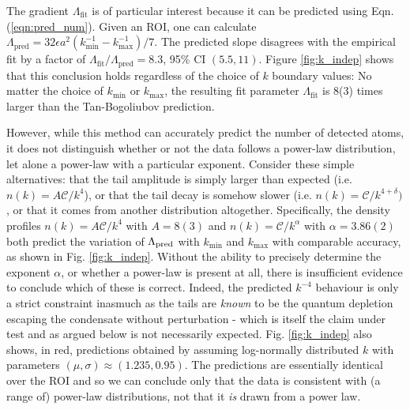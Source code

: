 	The gradient $\Lambda_\textrm{fit}$ is of particular interest because it can be predicted using Eqn. (\ref{eqn:pred_num}).
	Given an ROI, one can calculate $\Lambda_\textrm{pred} = 32\epsilon a^2(k_{\textrm{min}}^{-1}-k_{\textrm{max}}^{-1})/7$.
	The predicted slope disagrees with the empirical fit by a factor of $\Lambda_\textrm{fit}/\Lambda_\textrm{pred}= 8.3$, 95\% CI $(5.5,11)$.
	Figure \ref{fig:k_indep} shows that this conclusion holds regardless of the choice of $k$ boundary values: No matter the choice of $k_\textrm{min}$ or $k_\textrm{max}$, the resulting fit parameter $\Lambda_\textrm{fit}$ is 8(3) times larger than the Tan-Bogoliubov prediction. 

	However, while this method can accurately predict the number of detected atoms, it does not distinguish whether or not the data follows a power-law distribution, let alone a power-law with a particular exponent. 
	Consider these simple alternatives: that the tail amplitude is simply larger than expected (i.e. $n(k)=A\mathcal{C}/k^4$), or that the tail decay is somehow slower (i.e. $n(k)=\mathcal{C}/k^{4+\delta})$, or that it comes from another distribution altogether.
	Specifically, the density profiles $n(k)=A\mathcal{C}/k^4$ with $A=8(3)$ and $n(k)=\mathcal{C}/k^{\alpha}$ with $\alpha=3.86(2)$ both predict the variation of $\Lambda_{\rm pred}$ with $k_\textrm{min}$ and $k_\textrm{max}$ with comparable accuracy, as shown in Fig. \ref{fig:k_indep}. 
	Without the ability to precisely determine the exponent $\alpha$, or whether a power-law is present at all, there is insufficient evidence to conclude which of these is correct.
	Indeed, the predicted $k^{-4}$ behaviour is only a strict constraint inasmuch as the tails are \emph{known} to be the quantum depletion escaping the condensate without perturbation - which is itself the claim under test and as argued below is not necessarily expected.
	Fig. \ref{fig:k_indep} also shows, in red, predictions obtained by assuming log-normally distributed $k$ with parameters $(\mu,\sigma) \approx (1.235,0.95)$.
	The predictions are essentially identical over the ROI and so we can conclude only that the data is consistent with (a range of) power-law distributions, not that it \emph{is} drawn from a power law.


